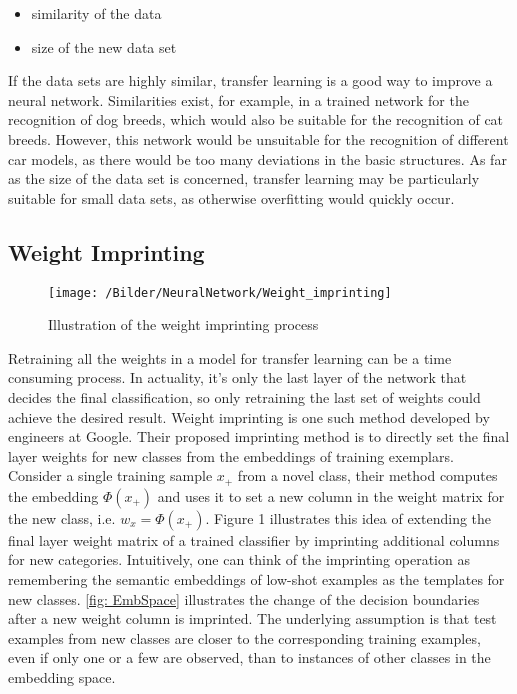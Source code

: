 \begin{itemize}
    \item similarity of the data
    \item size of the new data set
\end{itemize}

		
If the data sets are highly similar, transfer learning is a good way to improve a neural network. Similarities exist, for example, in a trained network for the recognition of dog breeds, which would also be suitable for the recognition of cat breeds. However, this network would be unsuitable for the recognition of different car models, as there would be too many deviations in the basic structures.	As far as the size of the data set is concerned, transfer learning may be particularly suitable for small data sets, as otherwise overfitting would quickly occur. \cite{Becker:2018}


\subsection{Weight Imprinting}

\begin{figure}[!h]
	\centering
	\texttt{[image: /Bilder/NeuralNetwork/Weight\_imprinting]}
	\caption{Illustration of the weight imprinting process \cite{qi:2018}}
\end{figure}

Retraining all the weights in a model for transfer learning can be a time consuming process. In actuality, it's only the last layer of the network that decides the final classification, so only retraining the last set of weights could achieve the desired result. Weight imprinting is one such method developed by engineers at Google. Their proposed imprinting method is to directly set
the final layer weights for new classes from the embeddings
of training exemplars. Consider a single training sample
$x_{+}$ from a novel class, their method computes the embedding $\Phi(x_{+})$ and uses it to set a new column in the weight
matrix for the new class, i.e. $w_{x} = \Phi(x_{+})$. Figure 1 illustrates this idea of extending the final layer weight matrix
of a trained classifier by imprinting additional columns for
new categories.
Intuitively, one can think of the imprinting operation as
remembering the semantic embeddings of low-shot examples as the templates for new classes. \autoref{fig: EmbSpace} illustrates
the change of the decision boundaries after a new weight
column is imprinted. The underlying assumption is that test
examples from new classes are closer to the corresponding
training examples, even if only one or a few are observed,
than to instances of other classes in the embedding space.


